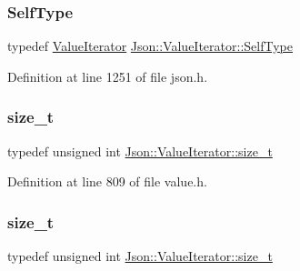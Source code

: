 \hypertarget{class_json_1_1_value_iterator_a23357670fdad61792670d86f62db7e16}{}\label{class_json_1_1_value_iterator_a23357670fdad61792670d86f62db7e16} 
\subsubsection{\texorpdfstring{Self\+Type}{SelfType}\hspace{0.1cm}{\footnotesize\ttfamily [2/2]}}
{\footnotesize\ttfamily typedef \hyperlink{class_json_1_1_value_iterator}{Value\+Iterator} \hyperlink{class_json_1_1_value_iterator_a23357670fdad61792670d86f62db7e16}{Json\+::\+Value\+Iterator\+::\+Self\+Type}}



Definition at line 1251 of file json.\+h.

\hypertarget{class_json_1_1_value_iterator_a308b8932ffc83eaa9d12dadd5c11a7dd}{}\label{class_json_1_1_value_iterator_a308b8932ffc83eaa9d12dadd5c11a7dd} 
\subsubsection{\texorpdfstring{size\+\_\+t}{size\_t}\hspace{0.1cm}{\footnotesize\ttfamily [1/2]}}
{\footnotesize\ttfamily typedef unsigned int \hyperlink{class_json_1_1_value_iterator_a308b8932ffc83eaa9d12dadd5c11a7dd}{Json\+::\+Value\+Iterator\+::size\+\_\+t}}



Definition at line 809 of file value.\+h.

\hypertarget{class_json_1_1_value_iterator_a308b8932ffc83eaa9d12dadd5c11a7dd}{}\label{class_json_1_1_value_iterator_a308b8932ffc83eaa9d12dadd5c11a7dd} 
\subsubsection{\texorpdfstring{size\+\_\+t}{size\_t}\hspace{0.1cm}{\footnotesize\ttfamily [2/2]}}
{\footnotesize\ttfamily typedef unsigned int \hyperlink{class_json_1_1_value_iterator_a308b8932ffc83eaa9d12dadd5c11a7dd}{Json\+::\+Value\+Iterator\+::size\+\_\+t}}



